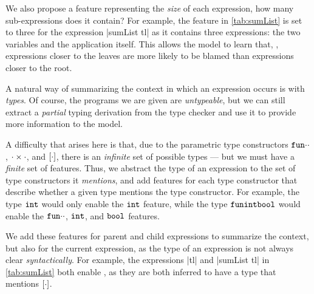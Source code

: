 
We also propose a feature representing the \emph{size} of each expression,
\ie how many sub-expressions does it contain?
%
For example, the \ExprSize feature in \autoref{tab:sumList} is set to three
for the expression |sumList tl| as it contains three expressions:
the two variables and the application itself.
%
This allows the model to learn that, \eg, expressions closer to the
leaves are more likely to be blamed than expressions closer to the root.

A natural way of summarizing the context in which an expression occurs
is with \emph{types}.
%
Of course, the programs we are given are \emph{untypeable}, but we can
still extract a \emph{partial} typing derivation from the type checker
and use it to provide more information to the model.

A difficulty that arises here is that, due to the parametric type
constructors $\mathtt{fun}{\cdot}{\cdot}$, $\cdot \times \cdot$, and
$[\cdot]$, there is an \emph{infinite} set of possible types ---
but we must have a \emph{finite} set of features.
%
Thus, we abstract the type of an expression to the set of type
constructors it \emph{mentions}, and add features for each type
constructor that describe whether a given type mentions the type
constructor.
%
For example, the type $\mathtt{int}$ would only enable the $\mathtt{int}$ feature,
while the type $\mathtt{fun}{\mathtt{int}}{\mathtt{bool}}$ would enable the
$\mathtt{fun}{\cdot}{\cdot}$, $\mathtt{int}$, and $\mathtt{bool}$ features.

We add these features for parent and child expressions to summarize the
context, but also for the current expression, as the type of an
expression is not always clear \emph{syntactically}.
%
For example, the expressions |tl| and |sumList tl|
in \autoref{tab:sumList} both enable \HasTypeList, as they
are both inferred to have a type that mentions $[\cdot]$.

